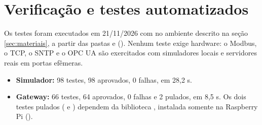 \section{Verificação e testes automatizados}

Os testes foram executados em 21/11/2026 com  no ambiente descrito na seção \ref{sec:materiais}, a partir das pastas  e  (). Nenhum teste exige hardware: o Modbus, o TCP, o SNTP e o OPC UA são exercitados com simuladores locais e servidores reais em portas efêmeras.

\begin{itemize}
    \item \textbf{Simulador:} 98 testes, 98 aprovados, 0 falhas, em 28,2 s.
    \item \textbf{Gateway:} 66 testes, 64 aprovados, 0 falhas e 2 pulados, em 8,5 s. Os dois testes pulados ( e ) dependem da biblioteca , instalada somente na Raspberry Pi ().
\end{itemize}

